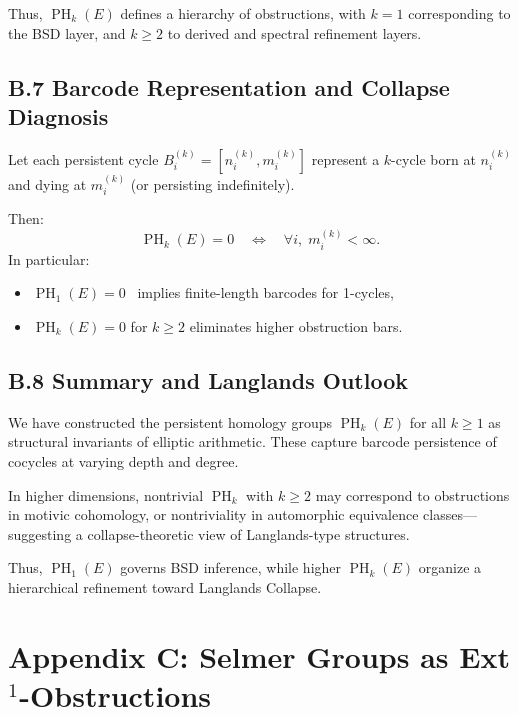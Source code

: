 \documentclass[11pt]{article}
\DeclareMathOperator{\PH}{PH}
\begin{document}
Thus, $\PH_k(E)$ defines a hierarchy of obstructions, with $k = 1$ corresponding to the BSD layer, and $k \geq 2$ to derived and spectral refinement layers.

\subsection*{B.7 Barcode Representation and Collapse Diagnosis}

Let each persistent cycle $B_i^{(k)} = [n_i^{(k)}, m_i^{(k)}]$ represent a $k$-cycle born at $n_i^{(k)}$ and dying at $m_i^{(k)}$ (or persisting indefinitely).

Then:
\[
\PH_k(E) = 0 \quad \Leftrightarrow \quad \forall i,\; m_i^{(k)} < \infty.
\]
In particular:
\begin{itemize}
  \item $\PH_1(E) = 0$ \ implies finite-length barcodes for 1-cycles,
  \item $\PH_k(E) = 0$ for $k \geq 2$ eliminates higher obstruction bars.
\end{itemize}

\subsection*{B.8 Summary and Langlands Outlook}

We have constructed the persistent homology groups $\PH_k(E)$ for all $k \geq 1$ as structural invariants of elliptic arithmetic. These capture barcode persistence of cocycles at varying depth and degree.

In higher dimensions, nontrivial $\PH_k$ with $k \geq 2$ may correspond to obstructions in motivic cohomology, or nontriviality in automorphic equivalence classes---suggesting a collapse-theoretic view of Langlands-type structures.

Thus, $\PH_1(E)$ governs BSD inference, while higher $\PH_k(E)$ organize a hierarchical refinement toward Langlands Collapse.




\section*{Appendix C: Selmer Groups as Ext$^1$-Obstructions}
\end{document}
